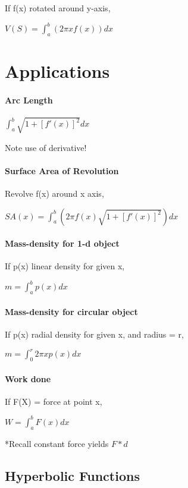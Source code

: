 \documentclass[10pt,landscape]{article}
\begin{document}
\begin{multicols}{4}
If f(x) rotated around y-axis,

$V(S) = \int_{a}^{b}(2\pi x f(x))dx$

\section{Applications}

\paragraph{Arc Length}

$\int_{a}^{b} \sqrt{1+[f'(x)]^2}dx$

Note use of derivative!

\paragraph{Surface Area of Revolution}

Revolve f(x) around x axis,

$SA(x) = \int_{a}^{b}(2 \pi f(x) \sqrt{1+[f'(x)]^2})dx$

\paragraph{Mass-density for 1-d object}

If p(x) linear density for given x,

$m = \int_{a}^{b}p(x)dx$

\paragraph{Mass-density for circular object}

If p(x) radial density for given x, and radius = r,

$m = \int_{0}^{r}2 \pi x p(x)dx$

\paragraph{Work done}

If F(X) = force at point x,

$W = \int_{a}^{b} F(x) dx$

*Recall constant force yields $F*d$

\subsection{Hyperbolic Functions}


\end{multicols}
\end{document}
